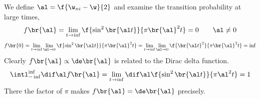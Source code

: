 \documentclass{article}
\begin{document}
We define $\al = \f{\w_{ni} - \w}{2}$ and examine the transition probability at large times,
\[ f\br{\al} = \lim_{t \to \inf}\f{\sin^2 \br{\al t}}{\pi \br{\al}^2 t} = 0 \qquad \al \neq 0 \]
\[ f\br{0} = \lim_{t \to \inf} \lim_{\al \to 0} \f{\sin^2 \br{\al t}}{\pi \br{\al}^2 t} = \lim_{t \to \inf} \lim_{\al \to 0} \f{\br{\al t}^2}{\pi \br{\al}^2 t} = \inf \]
Clearly $f\br{\al} \propto \de\br{\al}$ is related to the Dirac delta function.
\[ \intl_{-\inf}^{\inf} \dif \al f\br{\al} = \lim_{t \to \inf} \dif \al \f{\sin^2 \br{\al t}}{\pi \al^2 t} = 1 \]
There the factor of $\pi$ makes $f\br{\al} = \de \br{\al}$ precisely.
\end{document}
